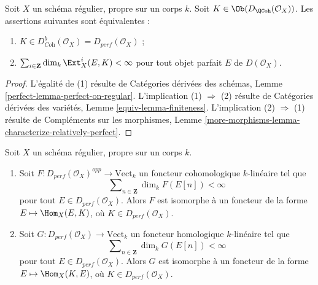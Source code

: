 \begin{lemma}
\label{lemma-characterize-dbcoh-proper-regular}
Soit $X$ un schéma régulier, propre sur un corps $k$. Soit
$K \in \Ob(D_\QCoh(\mathcal{O}_X))$. Les assertions suivantes sont
équivalentes :
\begin{enumerate}
\item $K \in D^b_{\textit{Coh}}(\mathcal{O}_X) = D_{perf}(\mathcal{O}_X)$ ;
\item $\sum_{i \in \mathbf{Z}} \dim_k \Ext^i_X(E, K) < \infty$
pour tout objet parfait $E$ de $D(\mathcal{O}_X)$.
\end{enumerate}
\end{lemma}

\begin{proof}
L'égalité de (1) résulte de Catégories dérivées des schémas,
Lemme \ref{perfect-lemma-perfect-on-regular}.
L'implication (1) $\Rightarrow$ (2) résulte de
Catégories dérivées des variétés, Lemme \ref{equiv-lemma-finiteness}.
L'implication (2) $\Rightarrow$ (1) résulte de
Compléments sur les morphismes, Lemme
\ref{more-morphisms-lemma-characterize-relatively-perfect}.
\end{proof}

\begin{lemma}
\label{lemma-bondal-van-den-bergh}
Soit $X$ un schéma régulier, propre sur un corps $k$.
\begin{enumerate}
\item Soit $F : D_{perf}(\mathcal{O}_X)^{opp} \to \text{Vect}_k$
un foncteur cohomologique $k$-linéaire tel que
$$
\sum\nolimits_{n \in \mathbf{Z}} \dim_k F(E[n]) < \infty
$$
pour tout $E \in D_{perf}(\mathcal{O}_X)$. Alors $F$ est isomorphe à un
foncteur de la forme $E \mapsto \Hom_X(E, K)$, où
$K \in D_{perf}(\mathcal{O}_X)$.
\item Soit $G : D_{perf}(\mathcal{O}_X) \to \text{Vect}_k$
un foncteur homologique $k$-linéaire tel que
$$
\sum\nolimits_{n \in \mathbf{Z}} \dim_k G(E[n]) < \infty
$$
pour tout $E \in D_{perf}(\mathcal{O}_X)$. Alors $G$ est isomorphe à un
foncteur de la forme $E \mapsto \Hom_X(K, E)$, où
$K \in D_{perf}(\mathcal{O}_X)$.
\end{enumerate}
\end{lemma}

